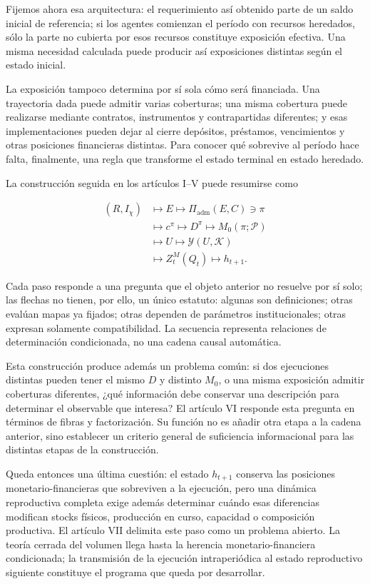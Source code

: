 \documentclass[10pt,a5paper,twoside]{article}
\begin{document}
Fijemos ahora esa arquitectura: el requerimiento así obtenido parte de un
saldo inicial de referencia; si los agentes comienzan el período con recursos
heredados, sólo la parte no cubierta por esos recursos constituye exposición
efectiva. Una misma necesidad calculada puede producir así exposiciones
distintas según el estado inicial.

La exposición tampoco determina por sí sola cómo será financiada. Una
trayectoria dada puede admitir varias coberturas; una misma cobertura puede
realizarse mediante contratos, instrumentos y contrapartidas diferentes; y
esas implementaciones pueden dejar al cierre depósitos, préstamos,
vencimientos y otras posiciones financieras distintas. Para conocer qué
sobrevive al período hace falta, finalmente, una regla que transforme el
estado terminal en estado heredado.

La construcción seguida en los artículos I--V puede resumirse como

\[
\begin{aligned}
(R,I_\chi)
&\mapsto E
\mapsto \Pi_{\mathrm{adm}}(E,C)
\ni \pi \\
&\mapsto c^\pi
\mapsto D^\pi
\mapsto M_0(\pi;\mathcal P) \\
&\mapsto U
\mapsto \mathcal Y(U,\mathcal K) \\
&\mapsto Z_t^M(Q_t)
\mapsto h_{t+1}.
\end{aligned}
\]

Cada paso responde a una pregunta que el objeto anterior no resuelve por sí
solo; las flechas no tienen, por ello, un único estatuto: algunas son
definiciones; otras evalúan mapas ya fijados; otras dependen de parámetros
institucionales; otras expresan solamente compatibilidad. La secuencia
representa relaciones de determinación condicionada, no una cadena causal
automática.

Esta construcción produce además un problema común: si dos ejecuciones
distintas pueden tener el mismo \(D\) y distinto \(M_0\), o una misma
exposición admitir coberturas diferentes, ¿qué información debe conservar una
descripción para determinar el observable que interesa? El artículo VI
responde esta pregunta en términos de fibras y factorización. Su función no es
añadir otra etapa a la cadena anterior, sino establecer un criterio general de
suficiencia informacional para las distintas etapas de la construcción.

Queda entonces una última cuestión: el estado \(h_{t+1}\) conserva las
posiciones monetario-financieras que sobreviven a la ejecución, pero una
dinámica reproductiva completa exige además determinar cuándo esas diferencias
modifican stocks físicos, producción en curso, capacidad o composición
productiva. El artículo VII delimita este paso como un problema abierto. La
teoría cerrada del volumen llega hasta la herencia monetario-financiera
condicionada; la transmisión de la ejecución intraperiódica al estado
reproductivo siguiente constituye el programa que queda por desarrollar.
\end{document}
